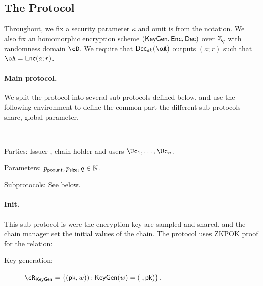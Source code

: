 \subsection{The Protocol}\label{sec:MainProtocol:Protocol}
Throughout, we fix a security parameter $\kappa$ and omit is from the notation. We also fix an homomorphic encryption scheme $(\mathsf{KeyGen},\mathsf{Enc},\mathsf{Dec})$ over ${\mathbb Z}_q$ with randomness domain $\cD$.  We require that $\Dec_{sk}(\oA)$ outputs   $(a;r)$ such that $\oA = \Enc(a;r)$.

\paragraph{Main protocol.}
We split  the protocol into several sub-protocols defined below, and  use the  following environment to define the common part the different sub-protocols share, \eg global parameter. 

\begin{protocol}~\label{prot:ConfidentialTransactions}


	
\item[Parties:] Issuer \Ic, chain-holder \Cc and users  $\Uc_1, \ldots,\Uc_n$.

\item[Parameters:] $p_{\mathsf{pcount}},p_{\mathsf{size}},q \in {\mathbb{N}}$.

\item[Subprotocols:]  See below.
\end{protocol}


\paragraph{Init.}
This sub-protocol is were the encryption key are sampled and shared, and the chain manager \Cc set the initial values of the chain. The protocol  uses ZKPOK proof for the relation:
\begin{description}
	\item[Key generation:]    $\rKeyGen =\rKeyGenDef$.
\end{description}


